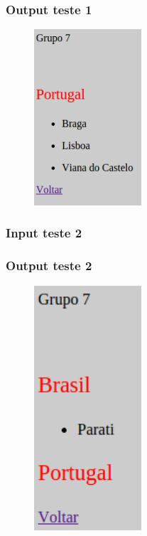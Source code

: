\subsubsection{Output teste 1}
\label{seq:anex-enamex-test-out01}

\begin{figure}[H]
\centering
\includegraphics[width=4cm]{anexos/2-2/output_teste1.png}
\end{figure}


\subsubsection{Input teste 2}
\label{seq:anex-enamex-test-in02}


\subsubsection{Output teste 2}
\label{seq:anex-enamex-test-out02}

\begin{figure}[H]
\centering
\includegraphics[width=4cm]{anexos/2-2/output_teste2.png}
\end{figure}

